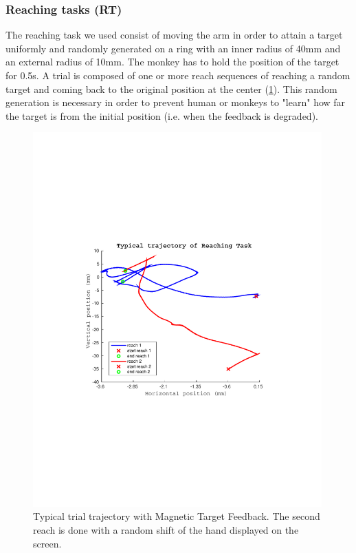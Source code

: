 \documentclass[preprint,12pt]{elsarticle}
\begin{document}
\subsubsection{Reaching tasks (RT)}
The reaching task we used consist of moving the arm in order to attain a target uniformly and randomly generated on a ring with an inner radius of 40mm and an external radius of 10mm. The monkey has to hold the position of the target for 0.5s. A trial is composed of one or more reach sequences of reaching a random target and coming back to the original position at the center (\ref{fig:RTtrajectory}). This random generation is necessary in order to prevent human or monkeys to "learn" how far the target is from the initial position (i.e. when the feedback is degraded).

\begin{figure}[htbp]
\centering
\includegraphics[width=0.99\textwidth,trim={4cm 8cm 4cm 8cm},clip]{figures/RT_trajectory.pdf}
\caption[Trial trajectory]{Typical trial trajectory with Magnetic Target Feedback. The second reach is done with a random shift of the hand displayed on the screen.}
\label{fig:RTtrajectory}
\end{figure}
\end{document}
